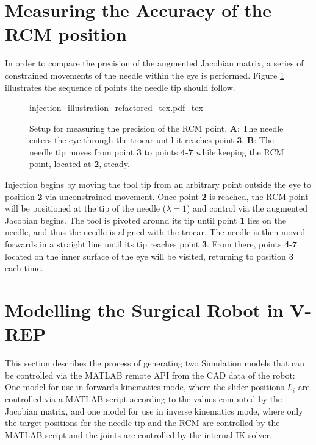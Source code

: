 \section{Measuring the Accuracy of the RCM position}\label{Setup}

In order to compare the precision of the augmented Jacobian matrix, a series of constrained movements of the needle within the eye is performed. Figure \ref{injection_illustration} illustrates the sequence of points the needle tip should follow.

\begin{figure}[h!]
	{injection_illustration_refactored_tex.pdf_tex}\caption{Setup for measuring the precision of the RCM point. \textbf{A}: The needle enters the eye through the trocar until it reaches point \textbf{3}. \textbf{B}: The needle tip moves from point \textbf{3} to points \textbf{4}-\textbf{7} while keeping the RCM point, located at \textbf{2}, steady.}
	\label{injection_illustration}
\end{figure}

Injection begins by moving the tool tip from an arbitrary point outside the eye to position \textbf{2} via unconstrained movement. Once point \textbf{2} is reached, the RCM point will be positioned at the tip of the needle ($\lambda=1$) and control via the augmented Jacobian begins. The tool is pivoted around its tip until point \textbf{1} lies on the needle, and thus the needle is aligned with the trocar. The needle is then moved forwards in a straight line until its tip reaches point \textbf{3}. From there, points \textbf{4}-\textbf{7} located on the inner surface of the eye will be visited, returning to position \textbf{3} each time.

\section{Modelling the Surgical Robot in V-REP}

This section describes the process of generating two Simulation models that can be controlled via the MATLAB remote API from the CAD data of the robot: One model for use in forwards kinematics mode, where the slider positions $L_i$ are controlled via a MATLAB script according to the values computed by the Jacobian matrix, and one model for use in inverse kinematics mode, where only the target positions for the needle tip and the RCM are controlled by the MATLAB script and the joints are controlled by the internal IK solver.

